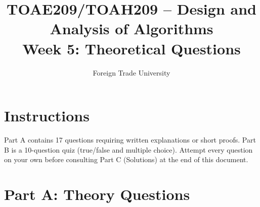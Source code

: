 \documentclass[11pt]{article}
\title{TOAE209/TOAH209 -- Design and Analysis of Algorithms\\[4pt]
\large Week 5: Theoretical Questions}
\author{Foreign Trade University}
\date{}
\begin{document}
\maketitle

\section*{Instructions}

Part A contains 17 questions requiring written explanations or short proofs.
Part B is a 10-question quiz (true/false and multiple choice). Attempt every
question on your own before consulting Part C (Solutions) at the end of this
document.

\section*{Part A: Theory Questions}
\end{document}
